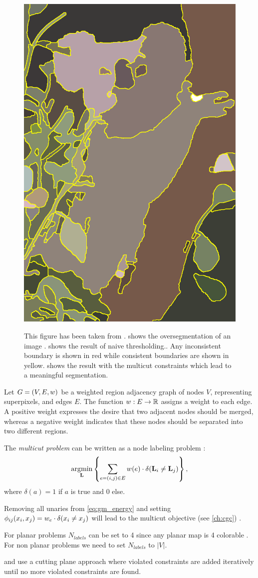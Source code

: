 \begin{figure}[h]
{{            \protect\includegraphics[width=.075\linewidth]{fig/andres/2.png} 
        }%
    }%
    \caption[Naive thresholding vs. multicuts]{
    This figure has been taken from \cite{andres_2011_iccv} .
     shows the oversegmentation of 
    an image .
     shows the result of naive thresholding..
    Any inconsistent boundary is shown in red while consistent
    boundaries are shown in yellow. 
     shows the result with the multicut
    constraints which lead to a meaningful segmentation.
    } \label{fig:naive_thresholding}
\end{figure}



Let $G=(V,E, w)$ be a weighted region adjacency graph of
nodes $V$, representing superpixels,
and edges $E$.
%
The function $w : E \rightarrow \mathbb{R}$ assigns a weight to each edge.
A positive weight expresses the desire that two adjacent nodes should
be merged, whereas a negative weight indicates
that these nodes should be separated into two different regions.


The \emph{multicut problem} can be written as a node labeling problem
\cite{bagon_2011_arxiv}:
%
\begin{align}
\operatorname*{\arg\!\min}_{\mathbf{L}}
    \left\{
    \sum_{ e=(i,j) \in E}
        w(e)
        \cdot \delta( \mathbf{L}_i \neq \mathbf{L}_j )
    \right\},
    \label{eq:multicut_primal_a}
\end{align}
%
where $\delta(a) = 1$ if $a$ is true and $0$ else.


Removing all unaries from \cref{eq:gm_energy} and 
setting $\phi_{ij}(x_i,x_j) =   w_e \cdot \delta( x_i \neq x_j )$ 
will lead to the multicut objective (see \cref{ch:cgc}) .

For planar problems  $N_{labels}$ can be set to 4 since any planar map is 4 colorable \citep{appel_1977_4color}.
For non planar problems we need to set $N_{labels}$ to $|V|$.


\citet{andres_2011_iccv} and \citet{kappes_2011_emmcvpr} use a
cutting plane approach where violated constraints are added
iteratively until no more violated constraints are found.

